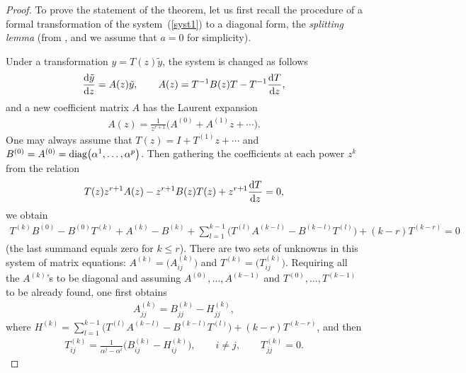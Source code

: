\documentclass[pdftex]{sigma}
\numberwithin{equation}{section}
\begin{document}
\begin{proof} To prove the statement of the theorem, let us first recall the procedure of a formal transformation of the
system~(\ref{syst1}) to a diagonal form, the {\it splitting lemma} (from \cite[Section~11]{Wa}, and we assume that $a=0$ for simplicity).

Under a transformation $y=T(z)\tilde y$, the system is changed as follows
\begin{gather*}
\frac{{\rm d}\tilde y}{{\rm d}z}=A(z) \tilde y, \qquad A(z)=T^{-1}B(z)T-T^{-1}\frac{{\rm d}T}{{\rm d}z},
\end{gather*}
and a new coefficient matrix $A$ has the Laurent expansion
\begin{gather*}
A(z)=\frac1{z^{r+1}}\bigl(A^{(0)}+A^{(1)}z+\cdots\bigr).
\end{gather*}
One may always assume that $T(z)=I+T^{(1)}z+\cdots$ and $B^{(0)}=A^{(0)}={\rm diag}\big(\alpha^1,\ldots,\alpha^p\big)$. Then gathering the coefficients at each power $z^k$ from the relation
\begin{gather*}
T(z) z^{r+1}A(z)-z^{r+1}B(z) T(z)+z^{r+1}\frac{{\rm d}T}{{\rm d}z}=0,
\end{gather*}
we obtain
\begin{gather*}
T^{(k)}B^{(0)}-B^{(0)}T^{(k)}+A^{(k)}-B^{(k)}+\sum_{l=1}^{k-1}\big(T^{(l)}A^{(k-l)}-B^{(k-l)}T^{(l)}\big)+(k-r)T^{(k-r)}=0
\end{gather*}
(the last summand equals zero for $k\leqslant r$). There are two sets of unknowns in this system of matrix equations:
$A^{(k)}=\big(A^{(k)}_{ij}\big)$ and $T^{(k)}=\big(T^{(k)}_{ij}\big)$. Requiring all the $A^{(k)}$'s to be diagonal and assuming
$A^{(0)},\ldots,A^{(k-1)}$ and $T^{(0)},\ldots,T^{(k-1)}$ to be already found, one first obtains
\begin{gather*}
A^{(k)}_{jj}=B^{(k)}_{jj}-H^{(k)}_{jj},
\end{gather*}
where $H^{(k)}=\sum\limits_{l=1}^{k-1}\big(T^{(l)}A^{(k-l)}-B^{(k-l)}T^{(l)}\big)+(k-r)T^{(k-r)}$, and then
\begin{gather*}
T^{(k)}_{ij}=\frac1{\alpha^j-\alpha^i}\bigl(B^{(k)}_{ij}-H^{(k)}_{ij}\bigr),\qquad i\ne j, \qquad T^{(k)}_{jj}=0.
\end{gather*}


\end{proof}
\end{document}
